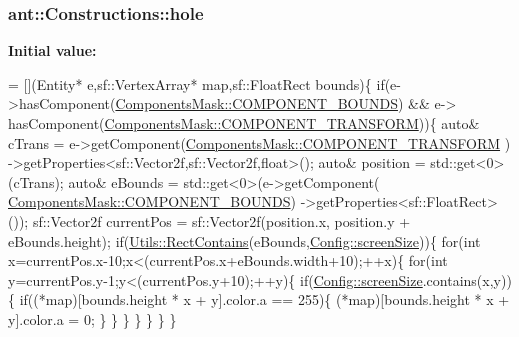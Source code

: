 \hypertarget{classant_1_1_constructions_a41b65912d7d2fd13b6fabe0af8ee88d6}{
\subsubsection[{hole}]{ ant\+::\+Constructions\+::hole\hspace{0.3cm}{\ttfamily [static]}}}\label{classant_1_1_constructions_a41b65912d7d2fd13b6fabe0af8ee88d6}
{\bfseries Initial value\+:}
\begin{DoxyCode}
= [](Entity* e,sf::VertexArray* map,sf::FloatRect bounds)\{
        \textcolor{keywordflow}{if}(e->hasComponent(\hyperlink{class_components_mask_a81ccaf0bf7344c970bc8474df2625ba7}{ComponentsMask::COMPONENT\_BOUNDS}) && e->
      hasComponent(\hyperlink{class_components_mask_a3a66579e45c351c13abe63e61f2eaa0a}{ComponentsMask::COMPONENT\_TRANSFORM}))\{
            \textcolor{keyword}{auto}& cTrans = e->getComponent(\hyperlink{class_components_mask_a3a66579e45c351c13abe63e61f2eaa0a}{ComponentsMask::COMPONENT\_TRANSFORM}
      )
                                ->getProperties<sf::Vector2f,sf::Vector2f,\textcolor{keywordtype}{float}>();
            \textcolor{keyword}{auto}& position = std::get<0>(cTrans);
            \textcolor{keyword}{auto}& eBounds = std::get<0>(e->getComponent(
      \hyperlink{class_components_mask_a81ccaf0bf7344c970bc8474df2625ba7}{ComponentsMask::COMPONENT\_BOUNDS})
                                            ->getProperties<sf::FloatRect>());
            sf::Vector2f currentPos = sf::Vector2f(position.x,
                                                   position.y + eBounds.height);
            \textcolor{keywordflow}{if}(\hyperlink{namespaceant_1_1_utils_a95b128173f4556c262ec4e9d3df2cbfa}{Utils::RectContains}(eBounds,\hyperlink{classant_1_1_config_a84b340cf79c14165c4960a4ea0ff56e0}{Config::screenSize}))\{
                \textcolor{keywordflow}{for}(\textcolor{keywordtype}{int} x=currentPos.x-10;x<(currentPos.x+eBounds.width+10);++x)\{
                    \textcolor{keywordflow}{for}(\textcolor{keywordtype}{int} y=currentPos.y-1;y<(currentPos.y+10);++y)\{
                        \textcolor{keywordflow}{if}(\hyperlink{classant_1_1_config_a84b340cf79c14165c4960a4ea0ff56e0}{Config::screenSize}.contains(x,y))\{
                            \textcolor{keywordflow}{if}((*map)[bounds.height * x + y].color.a == 255)\{
                                (*map)[bounds.height * x + y].color.a = 0;
                            \}
                        \}
                    \}
                \}
            \}
        \}
    \}
\end{DoxyCode}


